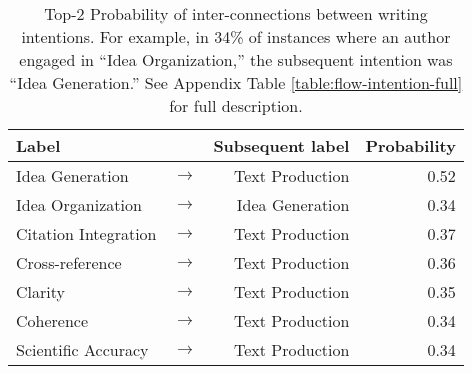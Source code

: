 \begin{table}[t!]
\footnotesize
\centering
\begin{tabular}{@{}lp{1pt}rr@{}}
\toprule
Label & & Subsequent label & Probability  \\
\midrule
\colorbox{planningcolor}{Idea Generation} & $\rightarrow$ & \colorbox{implementationcolor}{Text Production} & 0.52 \\
\colorbox{planningcolor}{Idea Organization} & $\rightarrow$ & \colorbox{planningcolor}{Idea Generation} & 0.34  \\
\midrule
\colorbox{implementationcolor}{Citation Integration} & $\rightarrow$ & \colorbox{implementationcolor}{Text Production} & 0.37 \\
\colorbox{implementationcolor}{Cross-reference} & $\rightarrow$ & \colorbox{implementationcolor}{Text Production} & 0.36  \\
\midrule
\colorbox{revisioncolor}{Clarity} & $\rightarrow$ & \colorbox{implementationcolor}{Text Production}  & 0.35  \\
\colorbox{revisioncolor}{Coherence} & $\rightarrow$ & \colorbox{implementationcolor}{Text Production}  & 0.34  \\
\colorbox{revisioncolor}{Scientific Accuracy} & $\rightarrow$ & \colorbox{implementationcolor}{Text Production}  & 0.34 \\
\bottomrule
\end{tabular}
\caption{Top-2 Probability of inter-connections between writing intentions. For example, in 34\% of instances where an author engaged in ``Idea Organization,'' the subsequent intention was ``Idea Generation.'' See Appendix Table \ref{table:flow-intention-full} for full description.\vspace{-2mm}}
\label{table:flow-intention}
\end{table}



